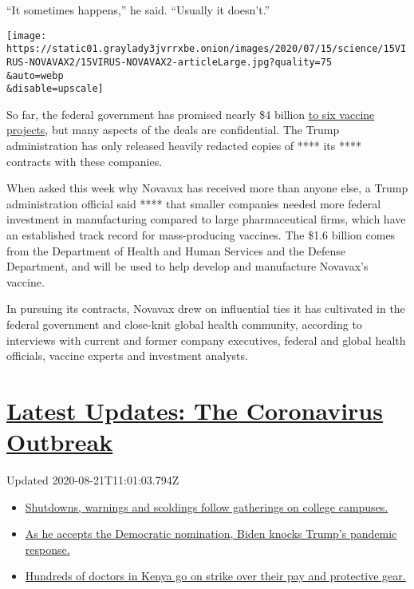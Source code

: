 ``It sometimes happens,'' he said. ``Usually it doesn't.''

\texttt{[image: https://static01.graylady3jvrrxbe.onion/images/2020/07/15/science/15VIRUS-NOVAVAX2/15VIRUS-NOVAVAX2-articleLarge.jpg?quality=75\\\&auto=webp\\\&disable=upscale]}

So far, the federal government has promised nearly \$4 billion
\href{https://medicalcountermeasures.gov/app/barda/coronavirus/COVID19.aspx}{to
six vaccine projects}, but many aspects of the deals are confidential.
The Trump administration has only released heavily redacted copies of
**** its **** contracts with these companies.

When asked this week why Novavax has received more than anyone else, a
Trump administration official said **** that smaller companies needed
more federal investment in manufacturing compared to large
pharmaceutical firms, which have an established track record for
mass-producing vaccines. The \$1.6 billion comes from the Department of
Health and Human Services and the Defense Department, and will be used
to help develop and manufacture Novavax's vaccine.

In pursuing its contracts, Novavax drew on influential ties it has
cultivated in the federal government and close-knit global health
community, according to interviews with current and former company
executives, federal and global health officials, vaccine experts and
investment analysts.

\hypertarget{latest-updates-the-coronavirus-outbreak}{%
\section{\texorpdfstring{\href{https://www.nytimes3xbfgragh.onion/2020/08/21/world/covid-19-coronavirus.html?action=click\&pgtype=Article\&state=default\&region=MAIN_CONTENT_1\&context=storylines_live_updates}{Latest
Updates: The Coronavirus
Outbreak}}{Latest Updates: The Coronavirus Outbreak}}\label{latest-updates-the-coronavirus-outbreak}}

Updated 2020-08-21T11:01:03.794Z

\begin{itemize}
\tightlist
\item
  \href{https://www.nytimes3xbfgragh.onion/2020/08/21/world/covid-19-coronavirus.html?action=click\&pgtype=Article\&state=default\&region=MAIN_CONTENT_1\&context=storylines_live_updates\#link-4690b6aa}{Shutdowns,
  warnings and scoldings follow gatherings on college campuses.}
\item
  \href{https://www.nytimes3xbfgragh.onion/2020/08/21/world/covid-19-coronavirus.html?action=click\&pgtype=Article\&state=default\&region=MAIN_CONTENT_1\&context=storylines_live_updates\#link-324af071}{As
  he accepts the Democratic nomination, Biden knocks Trump's pandemic
  response.}
\item
  \href{https://www.nytimes3xbfgragh.onion/2020/08/21/world/covid-19-coronavirus.html?action=click\&pgtype=Article\&state=default\&region=MAIN_CONTENT_1\&context=storylines_live_updates\#link-35890b73}{Hundreds
  of doctors in Kenya go on strike over their pay and protective gear.}
\end{itemize}

